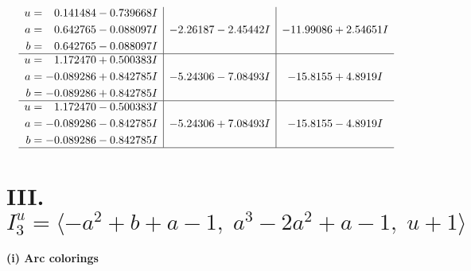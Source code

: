 \documentclass[1p]{elsarticle_modified}
\theoremstyle{definition}
\begin{document}
$$\begin{array}{c|c|c}
\begin{aligned}
u &= \phantom{-}0.141484 - 0.739668 I \\
a &= \phantom{-}0.642765 - 0.088097 I \\
b &= \phantom{-}0.642765 - 0.088097 I\end{aligned}
 & -2.26187 - 2.45442 I & -11.99086 + 2.54651 I \\ \hline\begin{aligned}
u &= \phantom{-}1.172470 + 0.500383 I \\
a &= -0.089286 + 0.842785 I \\
b &= -0.089286 + 0.842785 I\end{aligned}
 & -5.24306 - 7.08493 I & -15.8155 + 4.8919 I \\ \hline\begin{aligned}
u &= \phantom{-}1.172470 - 0.500383 I \\
a &= -0.089286 - 0.842785 I \\
b &= -0.089286 - 0.842785 I\end{aligned}
 & -5.24306 + 7.08493 I & -15.8155 - 4.8919 I\\
 \hline 
 \end{array}$$\newpage\newpage\renewcommand{\arraystretch}{1}
\centering \section*{III. $I^u_{3}= \langle - a^2+b+a-1,\;a^3-2 a^2+a-1,\;u+1 \rangle$}
\flushleft \textbf{(i) Arc colorings}\\
\end{document}
